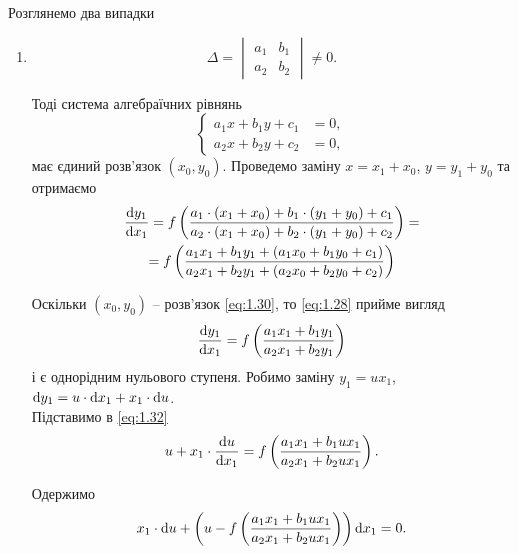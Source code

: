 Розглянемо два випадки
\begin{enumerate}
	\item 
	\begin{equation}
		\label{eq:1.29}
		\Delta = \begin{vmatrix} a_1 & b_1 \\ a_2 & b_2 \end{vmatrix} \ne 0.
	\end{equation}

	Тоді система алгебраїчних рівнянь
	\begin{equation}
		\label{eq:1.30}
		\left\{
			\begin{aligned}
				a_1 x + b_1 y + c_1 &= 0, \\
				a_2 x + b_2 y + c_2 &= 0,
			\end{aligned}
		\right.
	\end{equation}
	має єдиний розв’язок $(x_0, y_0)$. Проведемо заміну $x = x_1 + x_0$, $y = y_1 + y_0$ та отримаємо
	\begin{multline}
		\label{eq:1.31}
		\frac{\mathop{}\!\mathrm{d} y_1}{\mathop{}\!\mathrm{d} x_1} = f \left( \frac{a_1 \cdot (x_1 + x_0) + b_1 \cdot (y_1 + y_0) + c_1}{a_2 \cdot (x_1 + x_0) + b_2 \cdot (y_1 + y_0) + c_2} \right) = \\
		= f \left( \frac{a_1 x_1 + b_1 y_1 + (a_1 x_0 + b_1 y_0 + c_1)}{a_2 x_1 + b_2 y_1 + (a_2 x_0 + b_2 y_0 + c_2)} \right)
	\end{multline}

	Оскільки $(x_0, y_0)$ -- розв’язок \eqref{eq:1.30}, то \eqref{eq:1.28} прийме вигляд
	\begin{equation}
		\label{eq:1.32}
		\frac{\mathop{}\!\mathrm{d} y_1}{\mathop{}\!\mathrm{d} x_1} = f \left( \frac{a_1 x_1 + b_1 y_1}{a_2 x_1 + b_2 y_1} \right)
	\end{equation}
	і є однорідним нульового ступеня. Робимо заміну $y_1 = u x_1$, $\mathop{}\!\mathrm{d} y_1 = u \cdot \mathop{}\!\mathrm{d} x_1 + x_1 \cdot \mathop{}\!\mathrm{d} u$. \\

	Підставимо в \eqref{eq:1.32}
	\begin{equation}
		\label{eq:1.33}
		u + x_1 \cdot \frac{\mathop{}\!\mathrm{d} u}{\mathop{}\!\mathrm{d} x_1} = f \left( \frac{a_1 x_1 + b_1 u x_1}{a_2 x_1 + b_2 u x_1} \right).
	\end{equation}
	
	Одержимо
	\begin{equation}
		\label{eq:1.34}
		x_1 \cdot \mathop{}\!\mathrm{d} u + \left( u - f \left( \frac{a_1 x_1 + b_1 u x_1}{a_2 x_1 + b_2 u x_1} \right) \right) \mathop{}\!\mathrm{d} x_1 = 0.
	\end{equation}


\end{enumerate}
